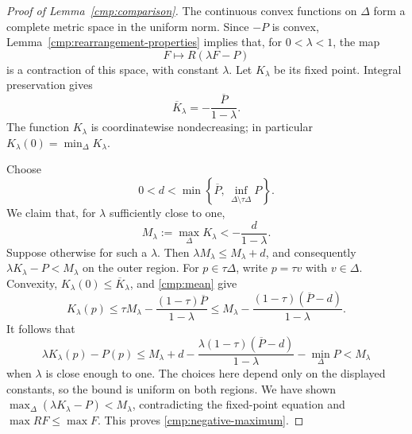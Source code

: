\begin{proof}[Proof of Lemma~\ref{cmp:comparison}]
The continuous convex functions on \(\Delta\) form a complete
metric space in the uniform norm. Since \(-P\) is convex,
Lemma~\ref{cmp:rearrangement-properties} implies that, for
\(0<\lambda<1\), the map
\[
 F\longmapsto R(\lambda F-P)
\]
is a contraction of this space, with constant \(\lambda\).
Let \(K_\lambda\) be its fixed point. Integral preservation gives
\begin{equation}\label{cmp:mean}
 \overline K_\lambda
 =-\frac{\overline P}{1-\lambda}.
\end{equation}
The function \(K_\lambda\) is coordinatewise nondecreasing;
in particular \(K_\lambda(0)=\min_\Delta K_\lambda\).

Choose
\[
 0<d<\min\left\{\overline P,\,
               \inf_{\Delta\setminus\tau\Delta}P\right\}.
\]
We claim that, for \(\lambda\) sufficiently close to one,
\begin{equation}\label{cmp:negative-maximum}
 M_\lambda:=\max_\Delta K_\lambda
 <-\frac d{1-\lambda}.
\end{equation}
Suppose otherwise for such a \(\lambda\).
Then \(\lambda M_\lambda\le M_\lambda+d\), and consequently
\(\lambda K_\lambda-P<M_\lambda\) on the outer region.
For \(p\in\tau\Delta\), write \(p=\tau v\) with \(v\in\Delta\).
Convexity, \(K_\lambda(0)\le\overline K_\lambda\), and
\eqref{cmp:mean} give
\[
 K_\lambda(p)
 \le \tau M_\lambda-
       \frac{(1-\tau)\overline P}{1-\lambda}
 \le M_\lambda-
       \frac{(1-\tau)(\overline P-d)}{1-\lambda}.
\]
It follows that
\[
 \lambda K_\lambda(p)-P(p)
 \le M_\lambda+d
 -\frac{\lambda(1-\tau)(\overline P-d)}{1-\lambda}
 -\min_\Delta P<M_\lambda
\]
when \(\lambda\) is close enough to one. The choices here depend
only on the displayed constants, so the bound is uniform on
both regions. We have shown
\(\max_\Delta(\lambda K_\lambda-P)<M_\lambda\), contradicting
the fixed-point equation and
\(\max RF\le\max F\). This proves
\eqref{cmp:negative-maximum}.


\end{proof}
